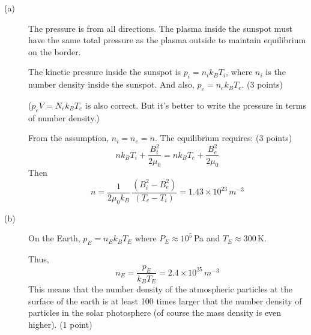 \begin{description}
\item[(a)] The pressure is from all directions. The plasma inside the sunspot
  must have the same total pressure as the plasma outside to maintain
  equilibrium on the border.

  The kinetic pressure inside the sunspot is $p_i = n_i k_B T_i$, where $n_i$
  is the number density inside the sunspot. And also,
  $p_e = n_e k_B T_e$. \hfill(3 points)

  ($p_e V = N_e k_B T_e$ is also correct. But it's better to write the
  pressure in terms of number density.)

  From the assumption, $n_i = n_e = n$. The equilibrium
  requires: \hfill(3 points)
  \begin{equation*}
  n k_B T_i + \frac{B_i^2}{2\mu_0} = n k_B T_e + \frac{B_e^2}{2\mu_0}
  \tag*{(8 points)}
  \end{equation*}
  Then
  \begin{equation*}
  n = \frac{1}{2\mu_0 k_B}\,\frac{(B_i^2 - B_e^2)}{(T_e - T_i)}
    = 1.43 \times 10^{23}\,m^{-3}
  \tag*{(6 points)}
  \end{equation*}
\item[(b)] On the Earth, $p_E = n_E k_B T_E$ where $P_E \approx 10^5$\,Pa and
  $T_E \approx 300$\,K.

  Thus,
  \begin{equation*}
  n_E = \frac{p_E}{k_B T_E} = 2.4 \times 10^{25}\,m^{-3}
  \tag*{(4 points)}
  \end{equation*}
  This means that the number density of the atmospheric particles at the
  surface of the earth is at least 100 times larger that the number density of
  particles in the solar photosphere (of course the mass density is even
  higher). \hfill(1 point)
\end{description}
